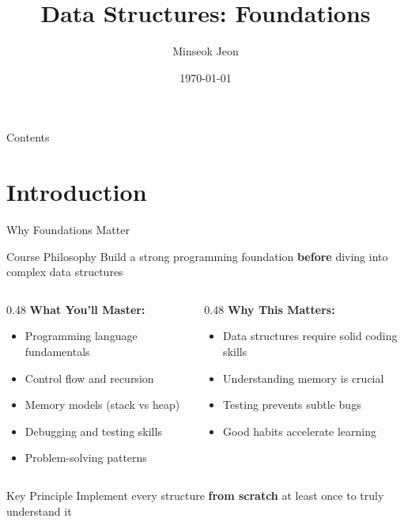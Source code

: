 \documentclass[aspectratio=169,xcolor=dvipsnames]{beamer}
\title[Foundations]{Data Structures: Foundations}
\author{Minseok Jeon}
\institute{DGIST}
\date{\today}
\begin{document}
\begin{frame}[plain]
  \titlepage
\end{frame}

\begin{frame}[plain]{Contents}
  \tableofcontents
\end{frame}

\section{Introduction}

\begin{frame}{Why Foundations Matter}
  \begin{block}{Course Philosophy}
    Build a strong programming foundation \textbf{before} diving into complex data structures
  \end{block}

  \vspace{0.5cm}

  \begin{columns}
    \begin{column}{0.48\textwidth}
      \textbf{What You'll Master:}
      \begin{itemize}
        \item Programming language fundamentals
        \item Control flow and recursion
        \item Memory models (stack vs heap)
        \item Debugging and testing skills
        \item Problem-solving patterns
      \end{itemize}
    \end{column}
    \begin{column}{0.48\textwidth}
      \textbf{Why This Matters:}
      \begin{itemize}
        \item Data structures require solid coding skills
        \item Understanding memory is crucial
        \item Testing prevents subtle bugs
        \item Good habits accelerate learning
      \end{itemize}
    \end{column}
  \end{columns}

  \vspace{0.5cm}

  \begin{alertblock}{Key Principle}
    Implement every structure \textbf{from scratch} at least once to truly understand it
  \end{alertblock}
\end{frame}
\end{document}

